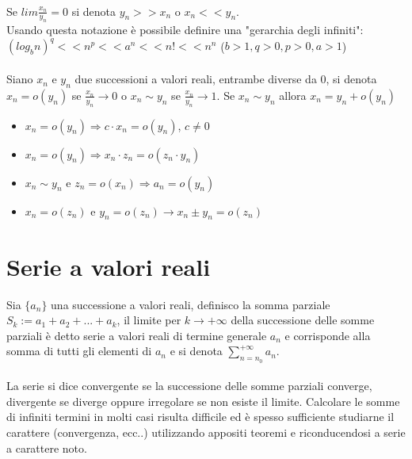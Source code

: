 \documentclass{article}
\begin{document}
\\
Se $lim\frac{x_n}{y_n}=0$ si denota $y_n>>x_n$ o $x_n<<y_n$.\\
Usando questa notazione è possibile definire una "gerarchia degli infiniti": $(log_bn)^q<<n^p<<a^n<<n!<<n^n$ ($b>1,q>0,p>0,a>1$)\\\\
Siano $x_n$ e $y_n$ due successioni a valori reali, entrambe diverse da 0, si denota $x_n=o(y_n)$ se $\frac{x_n}{y_n}\rightarrow0$ o $x_n\sim y_n$ se $\frac{x_n}{y_n}\rightarrow1$. Se $x_n\sim y_n$ allora $x_n=y_n+o(y_n)$
\begin{itemize}
    \item $x_n=o(y_n)\Rightarrow c\cdot x_n=o(y_n)$, $c\neq0$
    \item $x_n=o(y_n)\Rightarrow x_n\cdot z_n=o(z_n\cdot y_n)$
    \item $x_n\sim y_n$ e $z_n=o(x_n)\Rightarrow a_n=o(y_n)$
    \item $x_n=o(z_n)$ e $y_n=o(z_n)\rightarrow x_n\pm y_n=o(z_n)$
\end{itemize}

\section{Serie a valori reali}
Sia $\{a_n\}$ una successione a valori reali, definisco la somma parziale $S_k:=a_1+a_2+...+a_k$, il limite per $k\rightarrow+\infty$ della successione delle somme parziali è detto serie a valori reali di termine generale $a_n$ e corrisponde alla somma di tutti gli elementi di $a_n$ e si denota $\sum_{n=n_0}^{+\infty}a_n$.\\\\
La serie si dice convergente se la successione delle somme parziali converge, divergente se diverge oppure irregolare se non esiste il limite.
Calcolare le somme di infiniti termini in molti casi risulta difficile ed è spesso sufficiente studiarne il carattere (convergenza, ecc..) utilizzando appositi teoremi e riconducendosi a serie a carattere noto.
\end{document}
